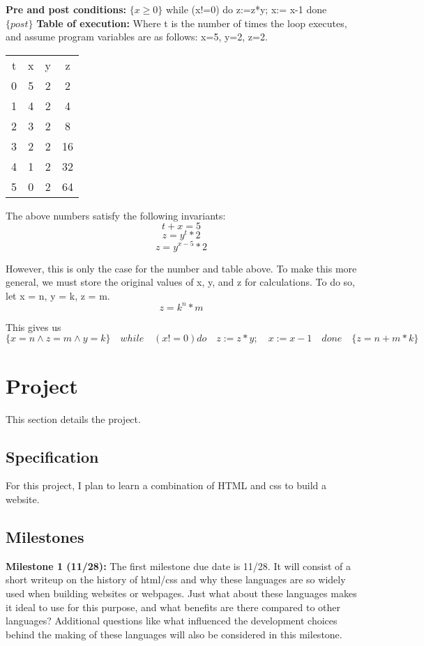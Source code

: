 \documentclass{article}
\theoremstyle{theorem}
\theoremstyle{definition}
\theoremstyle{remark}
\begin{document}
\textbf{Pre and post conditions:}
\newline $\{x \geq 0\}$  while (x!=0) do  z:=z*y; x:= x-1 done $\{post\}$ \newline
\textbf{Table of execution:}
\newline Where t is the number of times the loop executes, and assume program variables are as follows: x=5, y=2, z=2.
\begin{center}
\begin{tabular}{ c c c c }
 t & x & y & z \\ 
 0 & 5 & 2 & 2 \\  
 1 & 4 & 2 & 4 \\
 2 & 3 & 2 & 8 \\
 3 & 2 & 2 & 16 \\
 4 & 1 & 2 & 32 \\
 5 & 0 & 2 & 64 
\end{tabular}
\end{center}
The above numbers satisfy the following invariants:
\[t + x = 5\]
\[z = y^t * 2\]
\[z = y^{x-5} * 2\]

However, this is only the case for the number and table above. To make this more general, we must store the original values of x, y, and z for calculations. To do so, let x = n, y = k, z = m.
\[z = k^n * m \] 

This gives us 
\[\{x=n \wedge z=m \wedge y=k\} \quad while \quad (x!=0) do \quad z:=z*y; \quad x:= x-1 \quad done \quad \{z=n+m*k\}\]
 
\section{Project}

This section details the project.

\subsection{Specification}
For this project, I plan to learn a combination of HTML and css to build a website. 

\subsection{Milestones}
\textbf{Milestone 1 (11/28):} 
\newline\indent
The first milestone due date is 11/28. It will consist of a short writeup on the history of html/css and why these languages are so widely used when building websites or webpages. Just what about these languages makes it ideal to use for this purpose, and what benefits are there compared to other languages? Additional questions like what influenced the development choices behind the making of these languages will also be considered in this milestone.\newline
\end{document}
